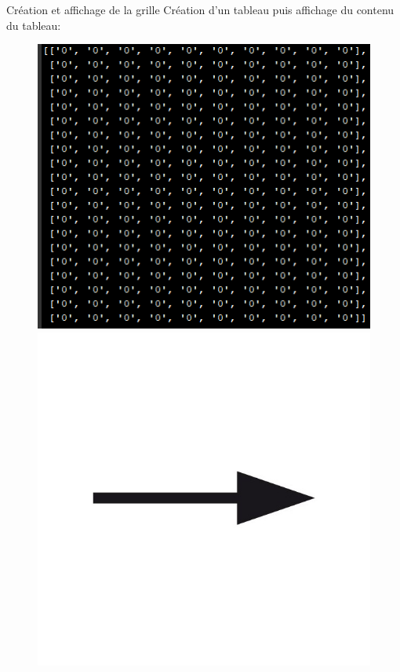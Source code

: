 \documentclass{beamer}
\begin{document}
	
	\begin{frame}{Création et affichage de la grille}
		Création d'un tableau puis affichage du contenu du tableau:
		
		\begin{figure}[t]
		
        	\includegraphics[scale=0.45]{images/tableau_de_la_grille.PNG}\hfill      	
        	\includegraphics[scale=0.07]{images/image.jpg} \hfill        	

\end{figure}
\end{frame}
\end{document}
